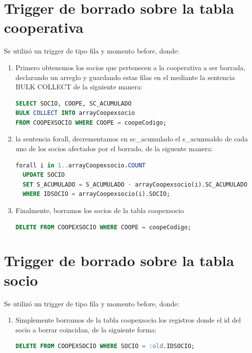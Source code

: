 \documentclass{article}
\begin{document}
\section{Trigger de borrado sobre la tabla cooperativa}\label{sec:trigger-de-borrado-sobre-la-tabla-cooperativa}

Se utilizó un trigger de tipo fila y momento before, donde:
    \begin{enumerate}
    \begin{enumerate}[4.1]
        \item Primero obtenemos los socios que pertenecen a la cooperativa a ser borrada, declarando un arreglo y guardando estas filas en el mediante la sentencia BULK COLLECT de la siguiente manera:
 \begin{lstlisting}[language=SQL,label={lst:lstlisting6}]
SELECT SOCIO, COOPE, SC_ACUMULADO 
BULK COLLECT INTO arrayCoopexsocio
FROM COOPEXSOCIO WHERE COOPE = coopeCodigo;   \end{lstlisting}

    \item la sentencia forall, decrementamos en sc\_acumulado  el s\_acumualdo de cada uno de los socios afectados por el borrado, de la siguente manera:
\begin{lstlisting}[language=SQL,label={lst:lstlisting7}]
forall i in 1..arrayCoopexsocio.COUNT
  UPDATE SOCIO
  SET S_ACUMULADO = S_ACUMULADO - arrayCoopexsocio(i).SC_ACUMULADO
  WHERE IDSOCIO = arrayCoopexsocio(i).SOCIO;\end{lstlisting}

  \item Finalmente, borramos los socios de la tabla coopexsocio

\begin{lstlisting}[language=SQL,label={lst:lstlisting8}]
DELETE FROM COOPEXSOCIO WHERE COOPE = coopeCodigo;    \end{lstlisting}
    \end{enumerate}
    \end{enumerate}

\section{Trigger de borrado sobre la tabla socio}\label{sec:trigger-de-borrado-sobre-la-tabla-socio}

Se utilizó un trigger de tipo fila y momento before, donde:
    \begin{enumerate}
    \begin{enumerate}[5.1]
        \item Simplemente borramos de la tabla coopexsocio los registros donde el id del socio a borrar coincidan, de la siguiente forma:

\begin{lstlisting}[language=SQL,label={lst:lstlisting9}]
DELETE FROM COOPEXSOCIO WHERE SOCIO = :old.IDSOCIO;    \end{lstlisting}
    \end{enumerate}
    \end{enumerate}
\end{document}
